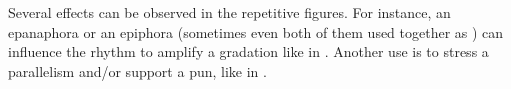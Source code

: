 Several effects can be observed in the repetitive figures. For instance, an epanaphora or an epiphora (sometimes even both of them used together as ) can influence the rhythm to amplify a gradation like in .
%
Another use is to stress a parallelism and/or support a pun, like in .


